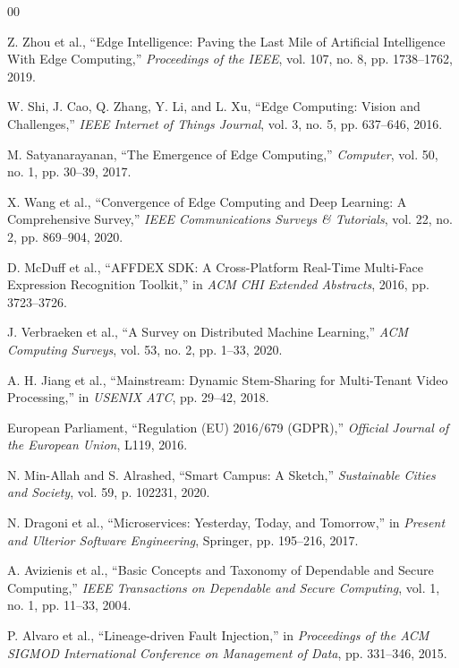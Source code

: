 \documentclass[conference]{IEEEtran}
\begin{document}
\begin{thebibliography}{00}

 Z. Zhou et al., ``Edge Intelligence: Paving the Last Mile of Artificial Intelligence With Edge Computing,'' \textit{Proceedings of the IEEE}, vol. 107, no. 8, pp. 1738--1762, 2019.

 W. Shi, J. Cao, Q. Zhang, Y. Li, and L. Xu, ``Edge Computing: Vision and Challenges,'' \textit{IEEE Internet of Things Journal}, vol. 3, no. 5, pp. 637--646, 2016.

 M. Satyanarayanan, ``The Emergence of Edge Computing,'' \textit{Computer}, vol. 50, no. 1, pp. 30--39, 2017.

 X. Wang et al., ``Convergence of Edge Computing and Deep Learning: A Comprehensive Survey,'' \textit{IEEE Communications Surveys \& Tutorials}, vol. 22, no. 2, pp. 869--904, 2020.

 D. McDuff et al., ``AFFDEX SDK: A Cross-Platform Real-Time Multi-Face Expression Recognition Toolkit,'' in \textit{ACM CHI Extended Abstracts}, 2016, pp. 3723--3726.

 J. Verbraeken et al., ``A Survey on Distributed Machine Learning,'' \textit{ACM Computing Surveys}, vol. 53, no. 2, pp. 1--33, 2020.

 A. H. Jiang et al., ``Mainstream: Dynamic Stem-Sharing for Multi-Tenant Video Processing,'' in \textit{USENIX ATC}, pp. 29--42, 2018.

 European Parliament, ``Regulation (EU) 2016/679 (GDPR),'' \textit{Official Journal of the European Union}, L119, 2016.

 N. Min-Allah and S. Alrashed, ``Smart Campus: A Sketch,'' \textit{Sustainable Cities and Society}, vol. 59, p. 102231, 2020.

 N. Dragoni et al., ``Microservices: Yesterday, Today, and Tomorrow,'' in \textit{Present and Ulterior Software Engineering}, Springer, pp. 195--216, 2017.

 A. Avizienis et al., ``Basic Concepts and Taxonomy of Dependable and Secure Computing,'' \textit{IEEE Transactions on Dependable and Secure Computing}, vol. 1, no. 1, pp. 11--33, 2004.

 P. Alvaro et al., ``Lineage-driven Fault Injection,'' in \textit{Proceedings of the ACM SIGMOD International Conference on Management of Data}, pp. 331--346, 2015.


\end{thebibliography}
\end{document}

